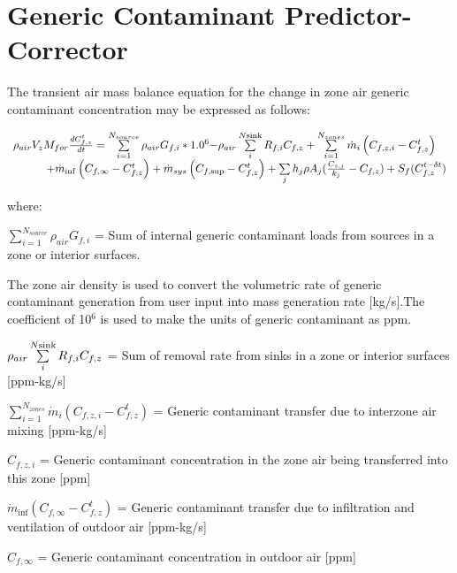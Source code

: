 \section{Generic Contaminant Predictor-Corrector}\label{generic-contaminant-predictor-corrector}

The transient air mass balance equation for the change in zone air generic contaminant concentration may be expressed as follows:

\begin{equation}
\begin{array}{l}{\rho_{air}}{V_z}{M_{for}}\frac{{dC_{f,z}^t}}{{dt}} = \sum\limits_{i = 1}^{{N_{source}}} {{\rho_{air}}{G_{f,i}}*{{1.0}^6} - } {\rho_{air}}\sum\limits_i^{N{\rm{sink}}} {{R_{f,i}}{C_{f,z}}}  + \sum\limits_{i = 1}^{{N_{zones}}} {{{\dot m}_i}} \left( {{C_{f,z,i}} - C_{f,z}^t} \right) \\
\quad \quad \quad + {{\dot m}_{\inf }}\left( {{C_{f,\infty }} - C_{f,z}^t} \right) + {{\dot m}_{sys}}\left( {{C_{f,\sup }} - C_{f,z}^t} \right) + \sum\limits_j {{h_j}\rho {A_j}(\frac{{{C_{s,j}}}}{{{k_j}}} - {C_{f,z}})}  + {S_f}(C_{f,z}^{t - \delta t})\end{array}
\end{equation}

where:

\(\sum\limits_{i = 1}^{{N_{source}}} {{\rho_{air}}{G_{f,i}}}\) = Sum of internal generic contaminant loads from sources in a zone or interior surfaces.

The zone air density is used to convert the volumetric rate of generic contaminant generation from user input into mass generation rate {[}kg/s{]}.The coefficient of 10\(^{6}\) is used to make the units of generic contaminant as ppm.

\({\rho_{air}}\sum\limits_i^{N{\rm{sink}}} {{R_{f,i}}{C_{f,z}}}\) = Sum of removal rate from sinks in a zone or interior surfaces {[}ppm-kg/s{]}

\(\sum_{i = 1}^{N_{zones}} \dot m_i \left( C_{f,z,i} - C_{f,z}^t \right)\) = Generic contaminant transfer due to interzone air mixing {[}ppm-kg/s{]}

\({C_{f,z,i}}\) = Generic contaminant concentration in the zone air being transferred into this zone {[}ppm{]}

\({\dot m_{\inf }}\left( {{C_{f,\infty }} - C_{f,z}^t} \right)\) = Generic contaminant transfer due to infiltration and ventilation of outdoor air {[}ppm-kg/s{]}

\({C_{f,\infty }}\) = Generic contaminant concentration in outdoor air {[}ppm{]}

